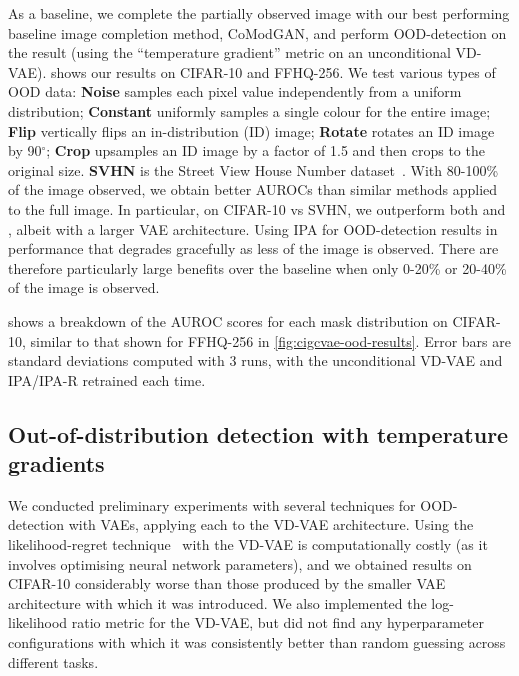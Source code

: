 As a baseline, we complete the partially observed image with our best performing
baseline image completion method, CoModGAN, and perform OOD-detection on the
result (using the ``temperature gradient'' metric on an unconditional VD-VAE).
 shows our results on CIFAR-10 and FFHQ-256. We test
various types of OOD data: \textbf{Noise} samples each pixel value independently
from a uniform distribution; \textbf{Constant} uniformly samples a single colour
for the entire image; \textbf{Flip} vertically flips an in-distribution (ID)
image; \textbf{Rotate} rotates an ID image by 90$^{\circ}$; \textbf{Crop}
upsamples an ID image by a factor of 1.5 and then crops to the original size.
\textbf{SVHN} is the Street View House Number dataset~\citep{netzer2011reading}.
With 80-100\% of the image observed, we obtain better AUROCs than similar
methods applied to the full image. In particular, on CIFAR-10 vs SVHN, we
outperform both \citet{xiao2020likelihood} and \citet{havtorn2021hierarchical},
albeit with a larger VAE architecture. Using IPA for OOD-detection results in
performance that degrades gracefully as less of the image is observed. There are
therefore particularly large benefits over the baseline when only 0-20\% or
20-40\% of the image is observed.

 shows a breakdown of the AUROC scores for each mask
distribution on CIFAR-10, similar to that shown for FFHQ-256 in
\cref{fig:cigcvae-ood-results}. Error bars are standard deviations computed with 3 runs,
with the unconditional VD-VAE and IPA/IPA-R retrained each time.



\subsection{Out-of-distribution detection with temperature gradients} \label{supp:cigcvae-temp-grad}


We conducted preliminary experiments with several techniques for OOD-detection
with VAEs, applying each to the VD-VAE architecture. Using the likelihood-regret
technique~\citep{xiao2020likelihood} with the VD-VAE is computationally costly
(as it involves optimising neural network parameters), and we obtained results
on CIFAR-10 considerably worse than those produced by the smaller VAE
architecture with which it was introduced. We also implemented the
log-likelihood ratio metric \citep{havtorn2021hierarchical} for the VD-VAE, but
did not find any hyperparameter configurations with which it was consistently
better than random guessing across different tasks.

